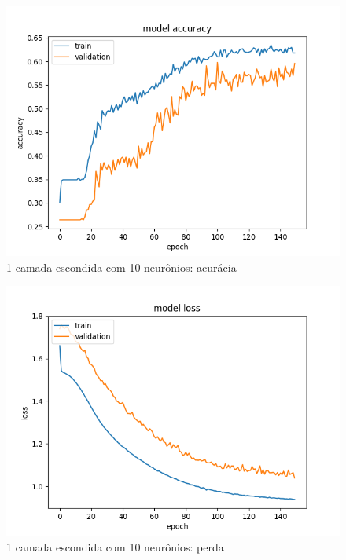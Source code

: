 \documentclass[11pt]{article}
\begin{document}
\begin{figure}
	\includegraphics[width=\linewidth]{exp/Figure_2.png}
	\caption{1 camada escondida com 10 neurônios: acurácia}
	\label{fig:f2}
\end{figure}

\begin{figure}
	\includegraphics[width=\linewidth]{exp/Figure_2-2.png}
	\caption{1 camada escondida com 10 neurônios: perda}
	\label{fig:f21}
\end{figure}
\end{document}
